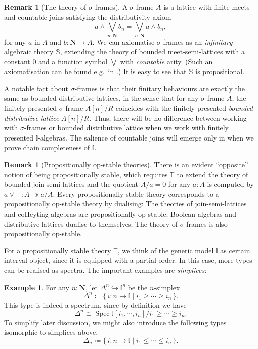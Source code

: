 \documentclass[a4paper,12pt]{amsart}
\theoremstyle{definition}
\newtheorem{example}[theorem]{Example}
\newtheorem{remark}[theorem]{Remark}
\newcommand{\mb}[1]{\mathbf{#1}}
\newcommand{\mbb}[1]{\mathbb{#1}}
\newcommand{\T}{\mbb T}
\newcommand{\I}{\mbb I}
\newcommand{\scomp}[2]{\{\,#1\mid#2\,\}}
\newcommand{\surj}{\twoheadrightarrow}
\newcommand{\hook}{\hookrightarrow}
\newcommand{\N}{\mb N}
\newcommand{\spec}{\operatorname{Spec}}
\begin{document}
\begin{remark}[The theory of $\sigma$-frames]\label{rem:sigmaframe}
  A $\sigma$-frame $A$ is a lattice with finite meets and countable joins satisfying the distributivity axiom 
  \[ a \wedge \bigvee_{n:\N} b_n = \bigvee_{n:\N} a \wedge b_n, \]
  for any $a$ in $A$ and $b \colon \N \to A$. We can axiomatise $\sigma$-frames as an \emph{infinitary} algebraic theory $\mbb S$, extending the theory of bounded meet-semi-lattices with a constant $0$ and a function symbol $\bigvee$ with \emph{countable} arity. (Such an axiomatisation can be found e.g.\ in \citet[Exa.~3.26]{adamek1994locally}.) It is easy to see that $\mbb S$ is propositional. 

  A notable fact about $\sigma$-frames is that their finitary behaviours are exactly the same as bounded distributive lattices, in the sense that for any $\sigma$-frame $A$, the finitely presented $\sigma$-frame $A[n]/R$ coincides with the finitely presented \emph{bounded distributive lattice} $A[n]/R$. Thus, there will be no difference between working with $\sigma$-frames or bounded distributive lattice when we work with finitely presented $\I$-algebras. The salience of countable joins will emerge only in  when we prove chain completeness of $\I$.
\end{remark}

\begin{remark}[Propositionally op-stable theories]\label{rem:opprop}
  There is an evident ``opposite'' notion of being propositionally stable, which requires $\T$ to extend the theory of bounded join-semi-lattices and the quotient $A/a = 0$ for any $a:A$ is computed by $a \vee - : A \surj a/A$. Every propositionally stable theory corresponds to a propositionally op-stable theory by dualising: The theories of join-semi-lattices and coHeyting algebras are propositionally op-stable; Boolean algebras and distributive lattices dualise to themselves; The theory of $\sigma$-frames is also propositionally op-stable.
\end{remark}

For a propositionally stable theory $\T$, we think of the generic model $\I$ as certain interval object, since it is equipped with a partial order. In this case, more types can be realised as spectra. The important examples are \emph{simplices}:

\begin{example}\label{exm:simplicesaffine}
  For any $n : \N$, let $\Delta^n \hook \I^n$ be the $n$-simplex
  \[ \Delta^n \coloneq \scomp{i \colon n \to \I}{i_1 \ge \cdots \ge i_n}. \]
  This type is indeed a spectrum, since by definition we have
  \[ \Delta^n \cong \spec\I[i_1,\cdots,i_n]/i_1\ge\cdots\ge i_n. \]
  To simplify later discussion, we might also introduce the following types isomorphic to simplices above,
  \[ \Delta_n \coloneq \scomp{i \colon n \to \I}{i_1 \le \cdots \le i_n}. \]
\end{example}
\end{document}
